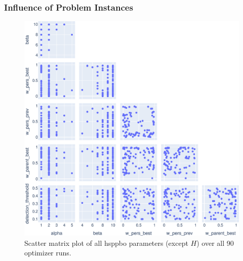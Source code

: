 \subsubsection{Influence of Problem Instances}

\begin{figure}[h]
	\centering
	\includegraphics[width=\textwidth]{results/part2/param_scatter_matrix_None.svg}
	\caption[Scatter matrix plot of all \gls{hsppbo} parameters]{Scatter matrix plot of all \gls{hsppbo} parameters (except $H$) over all 90 optimizer runs.}
	\label{fig:parameter_scatter_matrix}
\end{figure}


